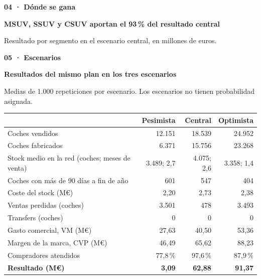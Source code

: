 \documentclass[aspectratio=169,10pt]{beamer}
\renewcommand{\arraystretch}{1.18}
\newcommand{\serif}{\bfseries}
\newcommand{\cab}[3]{%
  \vspace*{0mm}\hyphenpenalty=10000 \exhyphenpenalty=10000 \raggedright
  {\footnotesize\bfseries\color{sec}#1}\par\vspace{2mm}
  {\serif\fontsize{17}{20}\selectfont\color{tinta}#2\par}\vspace{1.5mm}
  {\small\color{sec}#3\par}\vspace{4mm}}
\begin{document}
\begin{frame}[t]
\cab{04 · Dónde se gana}{MSUV, SSUV y CSUV aportan el 93\,\% del resultado central}{Resultado por segmento en el escenario central, en millones de euros.}
\end{frame}

\begin{frame}[t]
\cab{05 · Escenarios}{Resultados del mismo plan en los tres escenarios}{Medias de 1.000 repeticiones por escenario. Los escenarios no tienen probabilidad asignada.}
{\fontsize{7.5}{8.8}\selectfont\renewcommand{\arraystretch}{1.05}
\begin{tabular*}{\linewidth}{@{\extracolsep{\fill}}lrrr@{}}
\toprule
 & \textcolor{pes}{\bfseries Pesimista} & \textcolor{cen}{\bfseries Central} & \textcolor{opt}{\bfseries Optimista}\\
\midrule
Coches vendidos & 12.151 & 18.539 & 24.952\\
Coches fabricados & 6.371 & 15.756 & 23.268\\
Stock medio en la red (coches; meses de venta) & 3.489; 2,7 & 4.075; 2,6 & 3.358; 1,4\\
Coches con más de 90 días a fin de año & 601 & 547 & 404\\
Coste del stock (M€) & 2,20 & 2,73 & 2,38\\
Ventas perdidas (coches) & 3.501 & 478 & 3.493\\
Transfers (coches) & 0 & 0 & 0\\
Gasto comercial, VM (M€) & 27,63 & 40,50 & 53,36\\
Margen de la marca, CVP (M€) & 46,49 & 65,62 & 88,23\\
Compradores atendidos & 77,8\,\% & 97,6\,\% & 87,9\,\%\\
\midrule
\textbf{Resultado (M€)} & \textbf{\textcolor{pes}{3,09}} & \textbf{\textcolor{cen}{62,88}} & \textbf{\textcolor{opt}{91,37}}\\
\bottomrule
\end{tabular*}}
\end{frame}
\end{document}

